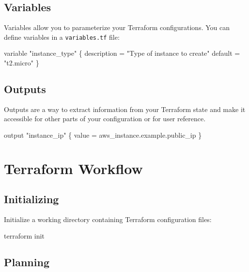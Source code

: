 \documentclass[
  letterpaper,
  DIV=11,
  numbers=noendperiod]{scrreprt}
\newenvironment{Shaded}{\begin{snugshade}}{\end{snugshade}}
\newcommand{\ExtensionTok}[1]{\textcolor[rgb]{0.00,0.23,0.31}{#1}}
\newcommand{\NormalTok}[1]{\textcolor[rgb]{0.00,0.23,0.31}{#1}}
\begin{document}
\subsection{Variables}\label{variables-1}

Variables allow you to parameterize your Terraform configurations. You
can define variables in a \texttt{variables.tf} file:

\begin{Shaded}
\begin{Highlighting}[]
\NormalTok{variable "instance\_type" \{}
\NormalTok{  description = "Type of instance to create"}
\NormalTok{  default     = "t2.micro"}
\NormalTok{\}}
\end{Highlighting}
\end{Shaded}

\subsection{Outputs}\label{outputs}

Outputs are a way to extract information from your Terraform state and
make it accessible for other parts of your configuration or for user
reference.

\begin{Shaded}
\begin{Highlighting}[]
\NormalTok{output "instance\_ip" \{}
\NormalTok{  value = aws\_instance.example.public\_ip}
\NormalTok{\}}
\end{Highlighting}
\end{Shaded}

\section{Terraform Workflow}\label{terraform-workflow}

\subsection{Initializing}\label{initializing}

Initialize a working directory containing Terraform configuration files:

\begin{Shaded}
\begin{Highlighting}[]
\ExtensionTok{terraform}\NormalTok{ init}
\end{Highlighting}
\end{Shaded}

\subsection{Planning}\label{planning}
\end{document}
